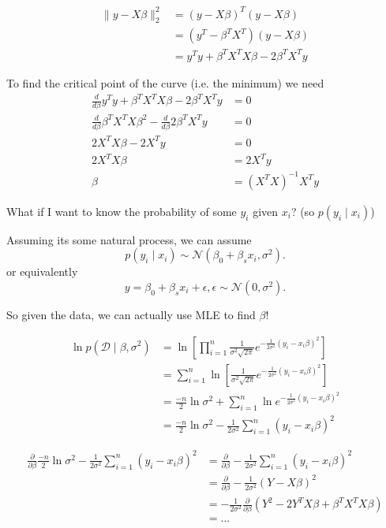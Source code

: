 \begin{align*}
\|y-X\beta\|^2_2 & = (y-X\beta)^T(y-X\beta)\\
& =  (y^T-\beta^TX^T)(y-X\beta)\\
& = y^Ty + \beta^TX^TX\beta - 2 \beta^TX^Ty
\end{align*}

To find the critical point of the curve (i.e. the minimum) we need
\begin{align*}
\frac{d}{d\beta} y^Ty + \beta^TX^TX\beta - 2 \beta^TX^Ty &= 0\\
\frac{d}{d\beta}\beta^TX^TX\beta^2  - \frac{d}{d\beta}2 \beta^TX^Ty &= 0\\
2 X^TX\beta - 2 X^Ty &=0\\
2 X^TX\beta &= 2 X^Ty \\
\beta &= (X^TX)^{-1}X^Ty
\end{align*}

What if I want to know the probability of some $y_i$ given $x_i$? (so $p(y_i\mid x_i)$)

Assuming its some natural process, we can assume 
\[p(y_i\mid x_i) \sim \mathcal{N}(\beta_0 + \beta_s x_i, \sigma^2).\]
or equivalently
\[y= \beta_0 + \beta_s x_i + \epsilon, \epsilon \sim \mathcal{N}(0,\sigma^2).\]

So given the data, we can actually use MLE to find $\beta$!

\begin{align*}
\ln p(\mathcal{D}\mid \beta, \sigma^2) &= \ln \left[\prod_{i=1}^{n} \frac{1}{\sigma^2\sqrt{2\pi}} e^{-\frac{1}{2\sigma^2}(y_i-x_i\beta)^2}\right]\\
	&= \sum_{i=1}^{n} \ln \left[\frac{1}{\sigma^2\sqrt{2\pi}} e^{-\frac{1}{2\sigma^2}(y_i-x_i\beta)^2}\right]\\
	&=  \frac{-n}{2}\ln \sigma^2 + \sum_{i=1}^{n} \ln e^{-\frac{1}{2\sigma^2}(y_i-x_i\beta)^2}\\
	&= \frac{-n}{2}\ln \sigma^2 -\frac{1}{2\sigma^2}\sum_{i=1}^{n} (y_i-x_i\beta)^2
\end{align*}

\begin{align*}
\frac{\partial}{\partial\beta} \frac{-n}{2}\ln \sigma^2 -\frac{1}{2\sigma^2}\sum_{i=1}^{n} (y_i-x_i\beta)^2 &= \frac{\partial}{\partial\beta} -\frac{1}{2\sigma^2}\sum_{i=1}^{n} (y_i-x_i\beta)^2\\
&=  \frac{\partial}{\partial\beta} -\frac{1}{2\sigma^2} (Y-X\beta)^2\\
&= -\frac{1}{2\sigma^2}  \frac{\partial}{\partial\beta} (Y^2-2Y^TX\beta+\beta^TX^TX\beta)\\
&= ... \\
\end{align*}

